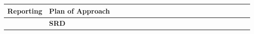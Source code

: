 \begin{table}[ht]
\begin{tabular}{ll|llllllllllllllllllll|}
    \multicolumn{1}{|l|}{\cellcolor[HTML]{38FFF8}\textbf{Reporting}}       & \cellcolor[HTML]{38FFF8}\textbf{Plan of Approach}                                                                    & \multicolumn{1}{l|}{\cellcolor[HTML]{F8A102}}           & \multicolumn{1}{l|}{}                                   & \multicolumn{1}{l|}{}                                   & \multicolumn{1}{l|}{}                                   & \multicolumn{1}{l|}{}                                   & \multicolumn{1}{l|}{}                                   & \multicolumn{1}{l|}{}                                   & \multicolumn{1}{l|}{}                                   & \multicolumn{1}{l|}{}                                   & \multicolumn{1}{l|}{}                                    & \multicolumn{1}{l|}{}                                    & \multicolumn{1}{l|}{}                                    & \multicolumn{1}{l|}{}                                    & \multicolumn{1}{l|}{}                                    & \multicolumn{1}{l|}{}                                    & \multicolumn{1}{l|}{}                                    & \multicolumn{1}{l|}{}                                    & \multicolumn{1}{l|}{}                                    & \multicolumn{1}{l|}{}                                    &             \\ \hline
    \multicolumn{1}{|l|}{\cellcolor[HTML]{38FFF8}\textbf{}}                & \cellcolor[HTML]{38FFF8}\textbf{SRD}                                                                                 & \multicolumn{1}{l|}{}                                   & \multicolumn{1}{l|}{\cellcolor[HTML]{F8A102}}           & \multicolumn{1}{l|}{}                                   & \multicolumn{1}{l|}{}                                   & \multicolumn{1}{l|}{}                                   & \multicolumn{1}{l|}{}                                   & \multicolumn{1}{l|}{}                                   & \multicolumn{1}{l|}{}                                   & \multicolumn{1}{l|}{}                                   & \multicolumn{1}{l|}{}                                    & \multicolumn{1}{l|}{}                                    & \multicolumn{1}{l|}{}                                    & \multicolumn{1}{l|}{}                                    & \multicolumn{1}{l|}{}                                    & \multicolumn{1}{l|}{}                                    & \multicolumn{1}{l|}{}                                    & \multicolumn{1}{l|}{}                                    & \multicolumn{1}{l|}{}                                    & \multicolumn{1}{l|}{}                                    &             \\ \hline

\end{tabular}
\end{table}
